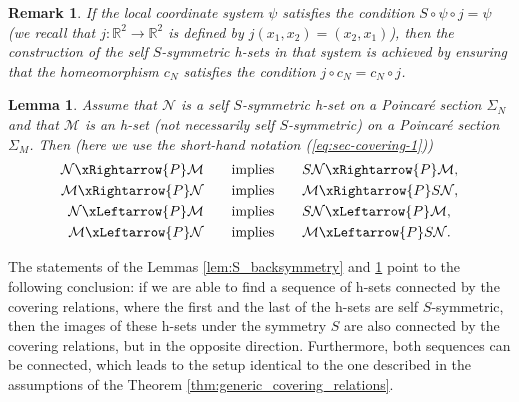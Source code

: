 \documentclass[1p]{article}
\newtheorem{remark}{Remark}
\newtheorem{lemma}{Lemma}
\begin{document}
\begin{remark}
    \label{rem:S_symmetry_cN}
    If the local coordinate system $\psi$ satisfies the condition $S \circ \psi \circ j = \psi$ (we recall that $j : \mathbb{R}^2 \to \mathbb{R}^2$ is defined by $j(x_1, x_2) = (x_2, x_1)$), then the construction of the self $S$-symmetric h-sets in that system is achieved by ensuring that the homeomorphism $c_N$ satisfies the condition $j \circ c_N = c_N \circ j$.
\end{remark}

\begin{lemma}
    \label{lem:self-symmetric-covering}
    Assume that $\mathcal{N}$ is a self $S$-symmetric h-set on a Poincar\'e section $\Sigma_N$ and that $\mathcal{M}$ is an h-set (not necessarily self $S$-symmetric) on a Poincar\'e section $\Sigma_M$. Then (here we use the short-hand notation (\ref{eq:sec-covering-1}))
    \begin{align*} 
        \mathcal{N} \xRightarrow{P} \mathcal{M} & \qquad \mbox{implies} \qquad S\mathcal{N} \xRightarrow{P} \mathcal{M}, \\
        \mathcal{M} \xRightarrow{P} \mathcal{N} & \qquad \mbox{implies} \qquad \mathcal{M} \xRightarrow{P} S\mathcal{N}, \\
        \mathcal{N} \xLeftarrow{P} \mathcal{M} & \qquad \mbox{implies} \qquad S\mathcal{N} \xLeftarrow{P} \mathcal{M}, \\
        \mathcal{M} \xLeftarrow{P} \mathcal{N} & \qquad \mbox{implies} \qquad \mathcal{M} \xLeftarrow{P} S\mathcal{N}.
    \end{align*}
\end{lemma}
    
The statements of the Lemmas \ref{lem:S_backsymmetry} and \ref{lem:self-symmetric-covering} point to the following conclusion: if we are able to find a sequence of h-sets connected by the covering relations, where the first and the last of the h-sets are self $S$-symmetric, then the images of these h-sets under the symmetry $S$ are also connected by the covering relations, but in the opposite direction. Furthermore, both sequences can be connected, which leads to the setup identical to the one described in the assumptions of the Theorem \ref{thm:generic_covering_relations}.
\end{document}
